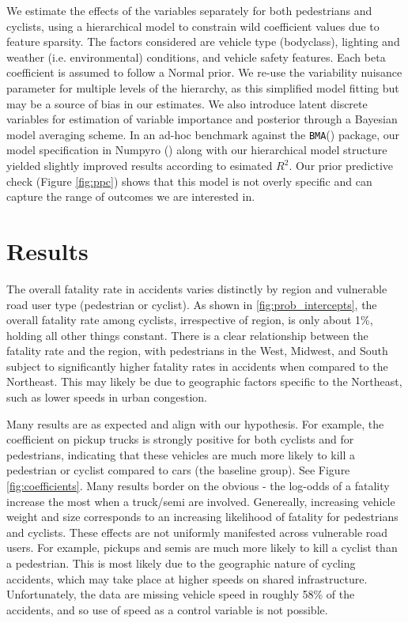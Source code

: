 \documentclass[12pt]{article}
\begin{document}
We estimate the effects of the variables separately for both pedestrians and cyclists, using a hierarchical model to constrain wild coefficient values due to feature sparsity. The factors considered are vehicle type (bodyclass), 
lighting and weather (i.e. environmental) conditions, and vehicle safety features. Each beta coefficient is assumed to follow a Normal prior. 
We re-use the variability nuisance parameter for multiple levels of the hierarchy, as this simplified model fitting but may be a source of bias in our estimates. We also introduce latent discrete variables for estimation of 
variable importance and posterior through a Bayesian model averaging scheme. 
In an ad-hoc benchmark against the \texttt{BMA}(\cite{raftery_bma_2022}) package, our model specification in Numpyro (\cite{phan_composable_2019}) along with our hierarchical model structure yielded slightly improved results according to
esimated $R^2$. Our prior predictive check (Figure \ref{fig:ppc}) shows that this model is not overly specific and can capture the range of outcomes we are interested in.

\section{Results}

The overall fatality rate in accidents varies distinctly by region and vulnerable road user
type (pedestrian or cyclist). As shown in \ref{fig:prob_intercepts}, the overall fatality rate
among cyclists, irrespective of region, is only about 1\%, holding all other things constant.
There is a clear relationship between the fatality rate and the region, with pedestrians in the West, Midwest, and South
subject to significantly higher fatality rates in accidents when compared to the Northeast. This may likely be due to geographic factors specific to
the Northeast, such as lower speeds in urban congestion.

Many results are as expected and align with our hypothesis. For example, the
coefficient on pickup trucks is strongly positive for both cyclists and for pedestrians, indicating that these vehicles
are much more likely to kill a pedestrian or cyclist compared to cars (the baseline group). See Figure \ref{fig:coefficients}. Many results border on the obvious - the log-odds of a fatality increase the most when
a truck/semi are involved. Genereally, increasing vehicle weight and size corresponds to an increasing
likelihood of fatality for pedestrians and cyclists. These effects are not uniformly manifested across
vulnerable road users. For example, pickups and semis are much more likely to kill a cyclist than a pedestrian. This is
most likely due to the geographic nature of cycling accidents, which may take place at higher speeds on shared infrastructure. 
Unfortunately, the data are missing vehicle speed in roughly 58\% of the accidents, and so use of speed as a control variable is not possible.
\end{document}
